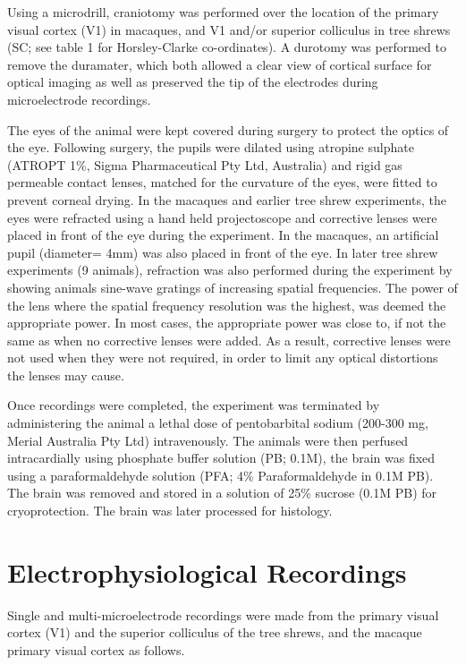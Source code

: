 		Using a microdrill, craniotomy was performed over the location of the primary visual cortex (V1) in macaques, and V1 and/or superior colliculus in tree shrews (SC; see table 1 for Horsley-Clarke co-ordinates). A durotomy was performed to remove the duramater, which both allowed a clear view of cortical surface for optical imaging as well as preserved the tip of the electrodes during microelectrode recordings. 
		
		The eyes of the animal were kept covered during surgery to protect the optics of the eye. Following surgery, the pupils were dilated using atropine sulphate (ATROPT 1\%, Sigma Pharmaceutical Pty Ltd, Australia) and rigid gas permeable contact lenses, matched for the curvature of the eyes, were fitted to prevent corneal drying. In the macaques and earlier tree shrew experiments, the eyes were refracted using a hand held projectoscope and corrective lenses were placed in front of the eye during the experiment. In the macaques, an artificial pupil (diameter= 4mm) was also placed in front of the eye. In later tree shrew experiments (9 animals), refraction was also performed during the experiment by showing animals sine-wave gratings of increasing spatial frequencies. The power of the lens where the spatial frequency resolution was the highest, was deemed the appropriate power. In most cases, the appropriate power was close to, if not the same as when no corrective lenses were added. As a result, corrective lenses were not used when they were not required, in order to limit any optical distortions the lenses may cause.
		
		Once recordings were completed, the experiment was terminated by administering the animal a lethal dose of pentobarbital sodium (200-300 mg, Merial Australia Pty Ltd) intravenously. The animals were then perfused intracardially using phosphate buffer solution (PB; 0.1M), the brain was fixed using a paraformaldehyde solution (PFA; 4\% Paraformaldehyde in 0.1M PB). The brain was removed and stored in a solution of 25\% sucrose (0.1M PB) for cryoprotection. The brain was later processed for histology.
		
		
	\section{Electrophysiological Recordings}
	
		Single and multi-microelectrode recordings were made from the primary visual cortex (V1) and the superior colliculus of the tree shrews, and the macaque primary visual cortex as follows.
		
